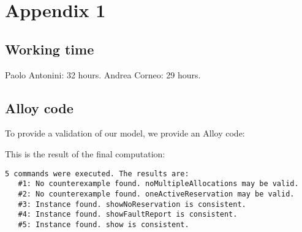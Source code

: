 \chapter{Appendix 1}

\section{Working time}

Paolo Antonini: 32 hours.
Andrea Corneo: 29 hours.

\section{Alloy code}

To provide a validation of our model, we provide an Alloy code:



This is the result of the final computation:

\begin{verbatim}
5 commands were executed. The results are:
   #1: No counterexample found. noMultipleAllocations may be valid.
   #2: No counterexample found. oneActiveReservation may be valid.
   #3: Instance found. showNoReservation is consistent.
   #4: Instance found. showFaultReport is consistent.
   #5: Instance found. show is consistent.
\end{verbatim} 